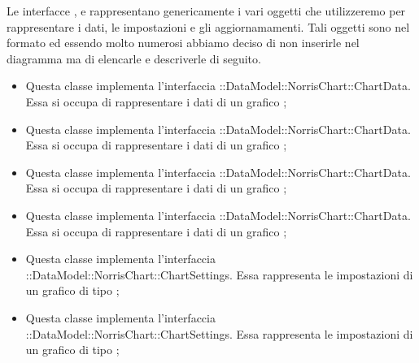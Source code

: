 	Le interfacce ,  \linebreak {} e  rappresentano genericamente i vari oggetti che utilizzeremo per rappresentare i dati, le impostazioni e gli aggiornamamenti. Tali oggetti sono nel formato  ed essendo molto numerosi abbiamo deciso di non inserirle nel diagramma ma di elencarle e descriverle di seguito.

	\begin{itemize}
		\item {} Questa classe implementa l'interfaccia ::DataModel::NorrisChart::ChartData. Essa si occupa di rappresentare i dati di un grafico ;

		\item {} Questa classe implementa l'interfaccia ::DataModel::NorrisChart::ChartData. Essa si occupa di rappresentare i dati di un grafico ;

		\item {} Questa classe implementa l'interfaccia ::DataModel::NorrisChart::ChartData. Essa si occupa di rappresentare i dati di un grafico ;

		\item {} Questa classe implementa l'interfaccia \linebreak {}::DataModel::NorrisChart::ChartData. Essa si occupa di rappresentare i dati di un grafico ;

		\item {} Questa classe implementa l'interfaccia ::DataModel::NorrisChart::ChartSettings. Essa rappresenta le impostazioni di un grafico di tipo ;

		\item {} Questa classe implementa l'interfaccia ::DataModel::NorrisChart::ChartSettings. Essa rappresenta le impostazioni di un grafico di tipo ;


\end{itemize}
